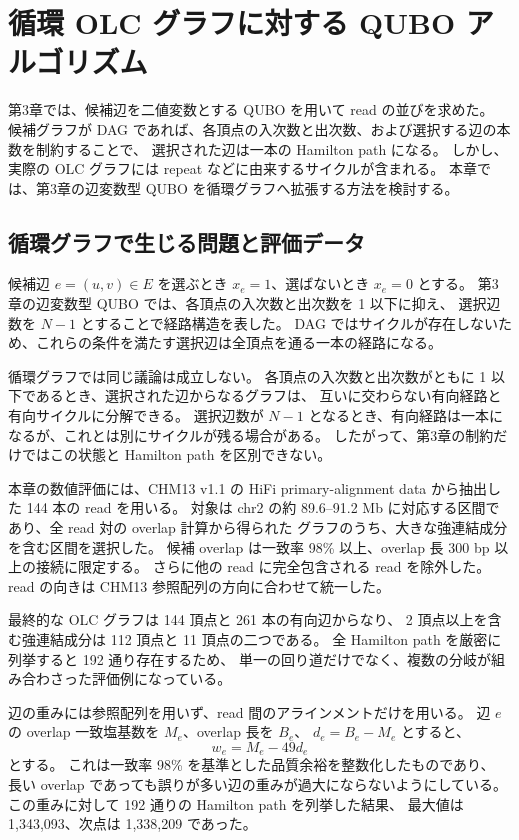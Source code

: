 \documentclass[a4j,10pt]{ujarticle}
\begin{document}
\section{循環 OLC グラフに対する QUBO アルゴリズム}

第3章では、候補辺を二値変数とする QUBO を用いて read の並びを求めた。
候補グラフが DAG であれば、各頂点の入次数と出次数、および選択する辺の本数を制約することで、
選択された辺は一本の Hamilton path になる。
しかし、実際の OLC グラフには repeat などに由来するサイクルが含まれる。
本章では、第3章の辺変数型 QUBO を循環グラフへ拡張する方法を検討する。

\subsection{循環グラフで生じる問題と評価データ}

候補辺 $e=(u,v)\in E$ を選ぶとき $x_e=1$、選ばないとき $x_e=0$ とする。
第3章の辺変数型 QUBO では、各頂点の入次数と出次数を 1 以下に抑え、
選択辺数を $N-1$ とすることで経路構造を表した。
DAG ではサイクルが存在しないため、これらの条件を満たす選択辺は全頂点を通る一本の経路になる。

循環グラフでは同じ議論は成立しない。
各頂点の入次数と出次数がともに 1 以下であるとき、選択された辺からなるグラフは、
互いに交わらない有向経路と有向サイクルに分解できる。
選択辺数が $N-1$ となるとき、有向経路は一本になるが、これとは別にサイクルが残る場合がある。
したがって、第3章の制約だけではこの状態と Hamilton path を区別できない。

本章の数値評価には、CHM13 v1.1 の HiFi primary-alignment data から抽出した
144 本の read を用いる。
対象は chr2 の約 89.6--91.2 Mb に対応する区間であり、全 read 対の overlap 計算から得られた
グラフのうち、大きな強連結成分を含む区間を選択した。
候補 overlap は一致率 98\% 以上、overlap 長 300 bp 以上の接続に限定する。
さらに他の read に完全包含される read を除外した。
read の向きは CHM13 参照配列の方向に合わせて統一した。

最終的な OLC グラフは 144 頂点と 261 本の有向辺からなり、
2 頂点以上を含む強連結成分は 112 頂点と 11 頂点の二つである。
全 Hamilton path を厳密に列挙すると 192 通り存在するため、
単一の回り道だけでなく、複数の分岐が組み合わさった評価例になっている。

辺の重みには参照配列を用いず、read 間のアラインメントだけを用いる。
辺 $e$ の overlap 一致塩基数を $M_e$、overlap 長を $B_e$、
$d_e=B_e-M_e$ とすると、
\begin{equation}
w_e=M_e-49d_e
\label{eq:complex144_weight}
\end{equation}
とする。
これは一致率 98\% を基準とした品質余裕を整数化したものであり、
長い overlap であっても誤りが多い辺の重みが過大にならないようにしている。
この重みに対して 192 通りの Hamilton path を列挙した結果、
最大値は 1,343,093、次点は 1,338,209 であった。
\end{document}
